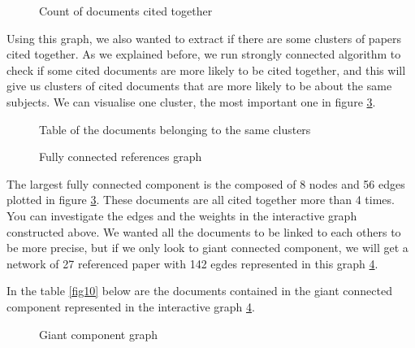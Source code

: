 \documentclass[article,twocolumn]{IEEEtran}
\begin{document}
    \begin{figure}
        \begin{center}\end{center}
        \caption{Count of documents cited together}
        \label{fig8}
    \end{figure}
    
    Using this graph, we also wanted to extract if there are some clusters
of papers cited together. As we explained before, we run strongly
connected algorithm to check if some cited documents are more likely to
be cited together, and this will give us clusters of cited documents
that are more likely to be about the same subjects. We can visualise one
cluster, the most important one in figure \ref{fig12}.


    \begin{figure}
        \begin{center}\end{center}
        \caption{Table of the documents belonging to the same clusters}
        \label{fig9}
    \end{figure}
    


    \begin{figure}
        \begin{center}\end{center}
        \caption{Fully connected references graph}
        \label{fig12}
    \end{figure}
    
    The largest fully connected component is the composed of 8 nodes and 56
edges plotted in figure \ref{fig12}. These documents are all cited
together more than 4 times. You can investigate the edges and the
weights in the interactive graph constructed above. We wanted all the
documents to be linked to each others to be more precise, but if we only
look to giant connected component, we will get a network of 27
referenced paper with 142 egdes represented in this graph \ref{fig15}.


    In the table \ref{fig10} below are the documents contained in the giant
connected component represented in the interactive graph \ref{fig15}.


    \begin{figure}
        \begin{center}\end{center}
        \caption{Giant component graph}
        \label{fig15}
    \end{figure}
    
\end{document}
